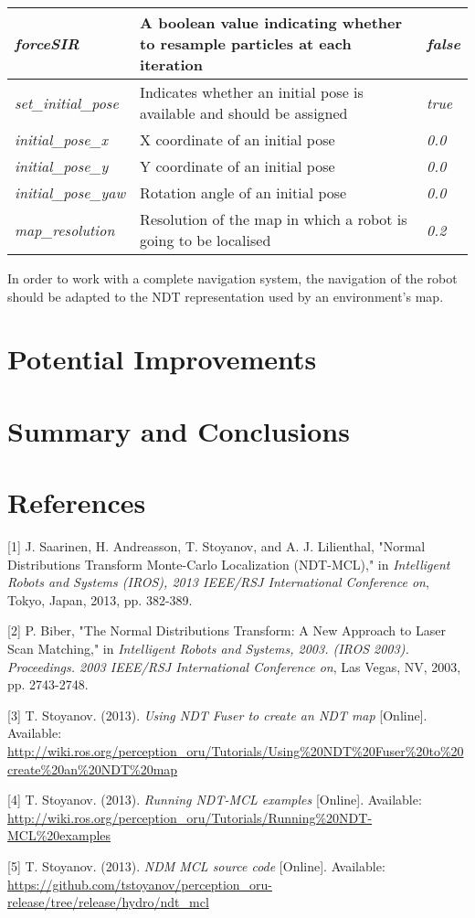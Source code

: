 \documentclass[12pt]{article}
\begin{document}
\begin{table}[H]
\begin{tabular}{|p{4cm}|p{7.2cm}|p{4cm}|}
			{\it forceSIR} & A boolean value indicating whether to resample particles at each iteration & {\it false} \\\hline
			{\it set\_initial\_pose} & Indicates whether an initial pose is available and should be assigned & {\it true} \\\hline
			{\it initial\_pose\_x} & X coordinate of an initial pose & {\it 0.0} \\\hline
			{\it initial\_pose\_y} & Y coordinate of an initial pose & {\it 0.0} \\\hline
			{\it initial\_pose\_yaw} & Rotation angle of an initial pose & {\it 0.0} \\\hline
			{\it map\_resolution} & Resolution of the map in which a robot is going to be localised & {\it 0.2} \\\hline
		\end{tabular}
	\end{table}

	In order to work with a complete navigation system, the navigation of the robot should be adapted to the NDT representation used by an environment's map.

	\section{Potential Improvements}
	\label{sec:potentialImprovements}

	\section{Summary and Conclusions}
	\label{sec:summaryAndConclusions}

	\section{References}
	\label{sec:references}

	\setlength{\parindent}{0.0in}
	\setlength{\parskip}{0.25in}

	[1] J. Saarinen, H. Andreasson, T. Stoyanov, and A. J. Lilienthal, "Normal Distributions Transform Monte-Carlo Localization (NDT-MCL)," in {\it Intelligent Robots and Systems (IROS), 2013 IEEE/RSJ International Conference on}, Tokyo, Japan, 2013, pp. 382-389.

	[2] P. Biber, "The Normal Distributions Transform: A New Approach to Laser Scan Matching," in {\it Intelligent Robots and Systems, 2003. (IROS 2003). Proceedings. 2003 IEEE/RSJ International Conference on}, Las Vegas, NV, 2003, pp. 2743-2748.

	[3] T. Stoyanov. (2013). {\it Using NDT Fuser to create an NDT map} [Online]. Available: \url{http://wiki.ros.org/perception_oru/Tutorials/Using%20NDT%20Fuser%20to%20create%20an%20NDT%20map}

	[4] T. Stoyanov. (2013). {\it Running NDT-MCL examples} [Online]. Available: \url{http://wiki.ros.org/perception_oru/Tutorials/Running%20NDT-MCL%20examples}

	[5] T. Stoyanov. (2013). {\it NDM MCL source code} [Online]. Available: \url{https://github.com/tstoyanov/perception_oru-release/tree/release/hydro/ndt_mcl}
\end{document}
